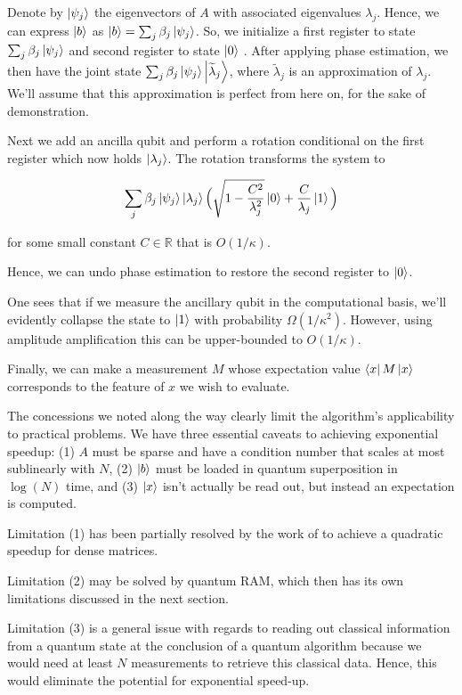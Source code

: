 \documentclass[12]{amsart}
\newcommand\0{\mathbf{0}}
\newcommand\RR{\mathbb{R}}
\newcommand\<{\langle}
\renewcommand\>{\rangle}
\begin{document}
Denote by $\ket{\psi_j}$ the eigenvectors of $A$ with associated eigenvalues $\lambda_j$. Hence, we can express $\ket{b}$ as $\ket{b} = \sum_j \beta_j \ket{\psi_j}$.  So, we initialize a first register to state $\sum_j \beta_j \ket{\psi_j}$ and second register to state $\ket{0}$ . After applying phase estimation, we then have the joint state $\sum_j \beta_j \ket{\psi_j} \ket{\widetilde{\lambda}_j}$, where $\widetilde{\lambda}_j$ is an approximation of $\lambda_j$. We'll assume that this approximation is perfect from here on, for the sake of demonstration. 

Next we add an ancilla qubit and perform a rotation conditional on the first register which now holds $\ket{\lambda_j}$. The rotation transforms the system to

\begin{align*}
\sum_j \beta_j \ket{\psi_j} \ket{\lambda_j} \Big(\sqrt{1-\frac{C^2}{\lambda_j^2}}\ket{0} + \frac{C}{\lambda_j}\ket{1}\Big)
\end{align*}

for some small constant $C \in \RR$ that is $O(1/\kappa)$.

Hence, we can undo phase estimation to restore the second register to $\ket{0}$.

One sees that if we measure the ancillary qubit in the computational basis, we'll evidently collapse the state to $\ket{1}$ with probability $\Omega(1/\kappa^2)$. However, using amplitude amplification this can be upper-bounded to $O(1/\kappa)$.  

Finally, we can make a measurement $M$ whose expectation value $\bra{x}M\ket{x}$ corresponds to the feature of $x$ we wish to evaluate. 

The concessions we noted along the way clearly limit the algorithm's applicability to practical problems. We have three essential caveats to achieving exponential speedup: (1) $A$ must be sparse and have a condition number that scales at most sublinearly with $N$, (2) $\ket{b}$ must be loaded in quantum superposition in $\log(N)$ time, and (3) $\ket{x}$ isn't actually be read out, but instead an expectation is computed.


Limitation (1) has been partially resolved by the work of \cite{wossnig2018quantum} to achieve a quadratic speedup for dense matrices. 

Limitation (2) may be solved by quantum RAM, which then has its own limitations discussed in the next section. 

Limitation (3) is a general issue with regards to reading out classical information from a quantum state at the conclusion of a quantum algorithm because we would need at least $N$ measurements to retrieve this classical data. Hence, this would eliminate the potential for exponential speed-up.  
\end{document}
